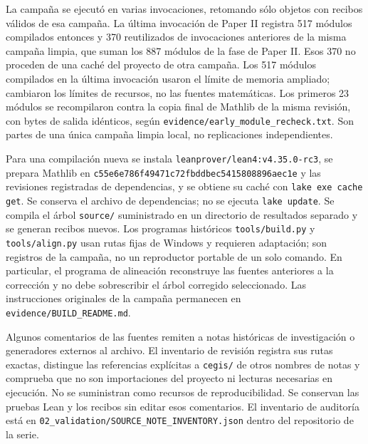 \documentclass[spanish,11pt,a4paper]{article}
\begin{document}
La campaña se ejecutó en varias invocaciones, retomando sólo objetos con recibos válidos de esa campaña. La última invocación de Paper II registra 517 módulos compilados entonces y 370 reutilizados de invocaciones anteriores de la misma campaña limpia, que suman los 887 módulos de la fase de Paper II. Esos 370 no proceden de una caché del proyecto de otra campaña. Los 517 módulos compilados en la última invocación usaron el límite de memoria ampliado; cambiaron los límites de recursos, no las fuentes matemáticas. Los primeros 23 módulos se recompilaron contra la copia final de Mathlib de la misma revisión, con bytes de salida idénticos, según \texttt{evidence/\allowbreak{}ear\allowbreak{}ly\_\allowbreak{}module\_\allowbreak{}re\allowbreak{}check.\allowbreak{}txt}. Son partes de una única campaña limpia local, no replicaciones independientes.

Para una compilación nueva se instala \texttt{leanprover/\allowbreak{}l\allowbreak{}ean4:v4.\allowbreak{}35.\allowbreak{}0\allowbreak{}-\allowbreak{}rc3}, se prepara Mathlib en \texttt{c55e6e78\allowbreak{}6f49\allowbreak{}471c\allowbreak{}72fbddbe\allowbreak{}\allowbreak{}c5415808\allowbreak{}896a\allowbreak{}ec1e\allowbreak{}} y las revisiones registradas de dependencias, y se obtiene su caché con \texttt{lake exe cac\allowbreak{}he get}. Se conserva el archivo de dependencias; no se ejecuta \texttt{lake update}. Se compila el árbol \texttt{source/\allowbreak{}} suministrado en un directorio de resultados separado y se generan recibos nuevos. Los programas históricos \texttt{tools/\allowbreak{}build.\allowbreak{}\allowbreak{}py} y \texttt{tools/\allowbreak{}align.\allowbreak{}\allowbreak{}py} usan rutas fijas de Windows y requieren adaptación; son registros de la campaña, no un reproductor portable de un solo comando. En particular, el programa de alineación reconstruye las fuentes anteriores a la corrección y no debe sobrescribir el árbol corregido seleccionado. Las instrucciones originales de la campaña permanecen en \texttt{evidence/\allowbreak{}BUI\allowbreak{}LD\_\allowbreak{}README.\allowbreak{}md\allowbreak{}}.

Algunos comentarios de las fuentes remiten a notas históricas de investigación o generadores externos al archivo. El inventario de revisión registra sus rutas exactas, distingue las referencias explícitas a \texttt{cegis/\allowbreak{}} de otros nombres de notas y comprueba que no son importaciones del proyecto ni lecturas necesarias en ejecución. No se suministran como recursos de reproducibilidad. Se conservan las pruebas Lean y los recibos sin editar esos comentarios. El inventario de auditoría está en \texttt{02\_\allowbreak{}validatio\allowbreak{}n/\allowbreak{}SOURCE\_\allowbreak{}NOT\allowbreak{}E\_\allowbreak{}INVENTORY.\allowbreak{}\allowbreak{}json} dentro del repositorio de la serie.
\end{document}
